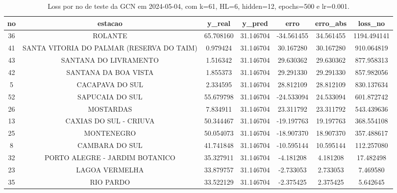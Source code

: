 \begin{table}[h]
\centering
\caption{Loss por no de teste da GCN em 2024-05-04, com k=61, HL=6, hidden=12, epochs=500 e lr=0.001.}
\label{tab:gcn_loss_k61_hl6_h12_e500_d20240504}
\begin{tabular}{ccccccc}
\toprule
no & estacao & y\_real & y\_pred & erro & erro\_abs & loss\_no \\
\midrule
36 & ROLANTE & 65.708160 & 31.146704 & -34.561455 & 34.561455 & 1194.494141 \\
41 & SANTA VITORIA DO PALMAR (RESERVA DO TAIM) & 0.979424 & 31.146704 & 30.167280 & 30.167280 & 910.064819 \\
43 & SANTANA DO LIVRAMENTO & 1.516342 & 31.146704 & 29.630362 & 29.630362 & 877.958313 \\
42 & SANTANA DA BOA VISTA & 1.855373 & 31.146704 & 29.291330 & 29.291330 & 857.982056 \\
5 & CACAPAVA DO SUL & 2.334595 & 31.146704 & 28.812109 & 28.812109 & 830.137634 \\
52 & SAPUCAIA DO SUL & 55.679798 & 31.146704 & -24.533094 & 24.533094 & 601.872742 \\
26 & MOSTARDAS & 7.834911 & 31.146704 & 23.311792 & 23.311792 & 543.439636 \\
13 & CAXIAS DO SUL - CRIUVA & 50.344467 & 31.146704 & -19.197763 & 19.197763 & 368.554108 \\
25 & MONTENEGRO & 50.054073 & 31.146704 & -18.907370 & 18.907370 & 357.488617 \\
8 & CAMBARA DO SUL & 41.741848 & 31.146704 & -10.595144 & 10.595144 & 112.257080 \\
32 & PORTO ALEGRE - JARDIM BOTANICO & 35.327911 & 31.146704 & -4.181208 & 4.181208 & 17.482498 \\
23 & LAGOA VERMELHA & 33.879757 & 31.146704 & -2.733053 & 2.733053 & 7.469580 \\
35 & RIO PARDO & 33.522129 & 31.146704 & -2.375425 & 2.375425 & 5.642645 \\
\bottomrule
\end{tabular}
\end{table}
